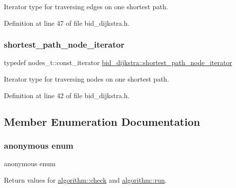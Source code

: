 Iterator type for traversing edges on one shortest path. 



Definition at line 47 of file bid\+\_\+dijkstra.\+h.

\mbox{\label{classbid__dijkstra_a47d15051149b03179778a1553635b9d3}} 
\subsubsection{\texorpdfstring{shortest\+\_\+path\+\_\+node\+\_\+iterator}{shortest\_path\_node\_iterator}}
{\footnotesize\ttfamily typedef nodes\+\_\+t\+::const\+\_\+iterator \mbox{\hyperlink{classbid__dijkstra_a47d15051149b03179778a1553635b9d3}{bid\+\_\+dijkstra\+::shortest\+\_\+path\+\_\+node\+\_\+iterator}}}



Iterator type for traversing nodes on one shortest path. 



Definition at line 42 of file bid\+\_\+dijkstra.\+h.



\subsection{Member Enumeration Documentation}
\mbox{\label{classalgorithm_af1a0078e153aa99c24f9bdf0d97f6710}} 
\subsubsection{\texorpdfstring{anonymous enum}{anonymous enum}}
{\footnotesize\ttfamily anonymous enum\hspace{0.3cm}{\ttfamily [inherited]}}



Return values for \mbox{\hyperlink{classalgorithm_a76361fb03ad1cf643affc51821e43bed}{algorithm\+::check}} and \mbox{\hyperlink{classalgorithm_a734b189509a8d6b56b65f8ff772d43ca}{algorithm\+::run}}. 


